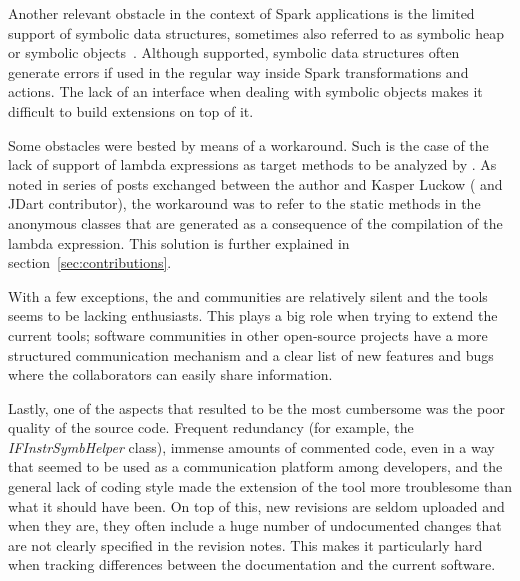 Another relevant obstacle in the context of Spark applications is the limited support of symbolic data structures, sometimes also referred to as symbolic heap or symbolic objects~\cite{Pasareanu2010}. Although supported, symbolic data structures often generate errors if used in the regular way inside Spark transformations and actions. The lack of an interface when dealing with symbolic objects makes it difficult to build extensions on top of it.

Some obstacles were bested by means of a workaround. Such is the case of the lack of support of lambda expressions as target methods to be analyzed by \spf{}. As noted in series of posts exchanged between the author and Kasper Luckow (\spf{} and JDart contributor), the workaround was to refer to the static methods in the anonymous classes that are generated as a consequence of the compilation of the lambda expression. This solution is further explained in section~\ref{sec:contributions}.

With a few exceptions, the \jpf{} and \spf{} communities are relatively silent and the tools seems to be lacking enthusiasts. This plays a big role when trying to extend the current tools; software communities in other open-source projects have a more structured communication mechanism and a clear list of new features and bugs where the collaborators can easily share information.

Lastly, one of the aspects that resulted to be the most cumbersome was the poor quality of the \spf{} source code. Frequent redundancy (for example, the \textit{IFInstrSymbHelper} class), immense amounts of commented code, even in a way that seemed to be used as a communication platform among developers, and the general lack of coding style made the extension of the tool more troublesome than what it should have been. On top of this, new revisions are seldom uploaded and when they are, they often include a huge number of undocumented changes that are not clearly specified in the revision notes. This makes it particularly hard when tracking differences between the documentation and the current software.